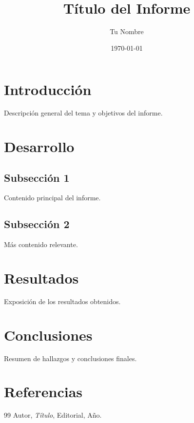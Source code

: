 \documentclass[12pt]{article}
\title{Título del Informe}
\author{Tu Nombre}
\date{\today}
\begin{document}
\maketitle

\tableofcontents
\newpage

\section{Introducción}
Descripción general del tema y objetivos del informe.

\section{Desarrollo}
\subsection{Subsección 1}
Contenido principal del informe.

\subsection{Subsección 2}
Más contenido relevante.

\section{Resultados}
Exposición de los resultados obtenidos.

\section{Conclusiones}
Resumen de hallazgos y conclusiones finales.

\section{Referencias}
\begin{thebibliography}{99}
 Autor, \textit{Título}, Editorial, Año.
\end{thebibliography}
\end{document}
